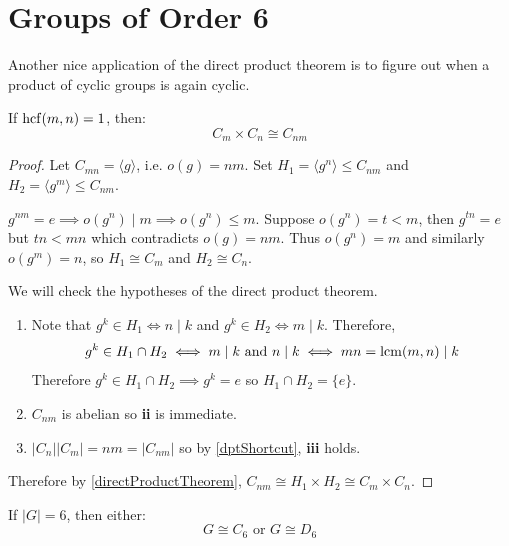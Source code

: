 \documentclass[../main.tex]{subfiles}
\begin{document}
\section{Groups of Order 6}
Another nice application of the direct product theorem is to figure out when a product of cyclic groups is again cyclic.
\begin{theorem}
  If $\operatorname{hcf}(m, n) = 1$, then:
  \[
    C_m \times C_n \cong C_{nm}
  \]
\end{theorem}
\begin{proof}
  Let $C_{mn} = \langle g \rangle$, i.e. $o(g) = nm$.
  Set $H_1 = \langle g^{n} \rangle \leq C_{nm}$ and $H_2 = \langle g^{m} \rangle \leq C_{nm}$.

  $g^{nm} = e \implies o(g^{n}) \mid m \implies o(g^{n}) \leq m$.
  Suppose $o(g^{n}) = t < m$, then $g^{tn} = e$ but $tn < mn$ which contradicts $o(g) = nm$.
  Thus $o(g^{n}) = m$ and similarly $o(g^{m}) = n$, so $H_1 \cong C_m$ and $H_2 \cong C_n$.

  We will check the hypotheses of the direct product theorem.
  \begin{enumerate}
    \item Note that $g^{k} \in H_1 \iff n \mid k$ and $g^{k} \in H_2 \iff m \mid k$.
      Therefore,
      \[
        g^{k} \in H_1 \cap H_2 \iff m \mid k \text{ and } n \mid k \iff mn = \operatorname{lcm}(m, n) \mid k
      \]
      Therefore $g^{k} \in H_1 \cap H_2 \implies g^{k} = e$ so $H_1 \cap H_2 = \{e\}$.
    \item $C_{nm}$ is abelian so \textbf{ii} is immediate.
    \item $|C_n||C_m| = nm = |C_{nm}|$ so by \cref{dptShortcut}, \textbf{iii} holds.
  \end{enumerate}
  Therefore by \cref{directProductTheorem}, $C_{nm} \cong H_1 \times H_2 \cong C_m \times C_n$.
\end{proof}
\begin{lemma}
  If $|G| = 6$, then either: \label{groupsOfOrder6}
  \[
    G \cong C_6 \text{ or } G \cong D_6
  \]
\end{lemma}
\end{document}

